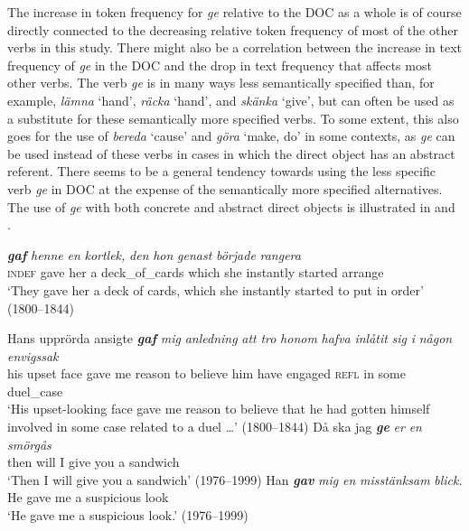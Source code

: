 \documentclass[output=paper]{langscibook}
\begin{document}
The increase in token frequency for \textit{ge} relative to the DOC as a whole is of course directly connected to the decreasing relative token frequency of most of the other verbs in this study. There might also be a correlation between the increase in text frequency of \textit{ge} in the DOC and the drop in text frequency that affects most other verbs. The verb \textit{ge} is in many ways less semantically specified than, for example, \textit{lämna} ‘hand’, \textit{räcka} ‘hand’, and \textit{skänka} ‘give’, but can often be used as a substitute for these semantically more specified verbs. To some extent, this also goes for the use of \textit{bereda} ‘cause’ and \textit{göra} ‘make, do’ in some contexts, as \textit{ge} can be used instead of these verbs in cases in which the direct object has an abstract referent. There seems to be a general tendency towards using the less specific verb \textit{ge} in DOC at the expense of the semantically more specified alternatives. The use of \textit{ge} with both concrete and abstract direct objects is illustrated in  and .\pagebreak


\ea \label{ex:valdeson:34}
\ea {} \textbf{\textit{gaf}} \textit{henne} \textit{en} \textit{kortlek,} \textit{den} \textit{hon} \textit{genast} \textit{började}   \textit{rangera}\\
 \textsc{indef}       gave     her     a   deck\_of\_cards    which    she instantly started           arrange\\ 
\glt ‘They gave her a deck of cards, which she instantly started to put in order’ (1800–1844)

\ex
\gll Hans   upprörda   ansigte \textbf{\textit{gaf}} \textit{mig} \textit{anledning}   \textit{att}   \textit{tro}   \textit{honom} \textit{hafva}   \textit{inlåtit}   \textit{sig}   \textit{i}   \textit{någon} \textit{envigssak}\\
 his       upset         face     gave   me   reason         to     believe  him         have       engaged \textsc{refl} in   some   duel\_case\\
\glt ‘His upset-looking face gave me reason to believe that he had gotten himself involved in some case related to a duel …’ (1800–1844)
\z
\ex \label{ex:valdeson:35}
\ea
\gll Då   ska   jag \textbf{\textit{ge}} \textit{er}     \textit{en} \textit{smörgås}\\
      then   will   I   give you   a   sandwich\\
\glt ‘Then I will give you a sandwich’ (1976–1999)
\ex
\gll Han \textbf{\textit{gav}} \textit{mig}   \textit{en} \textit{misstänksam} \textit{blick}.\\
        He     gave   me     a   suspicious     look\\
\glt ‘He gave me a suspicious look.’ (1976–1999)
\z
\z
\end{document}

